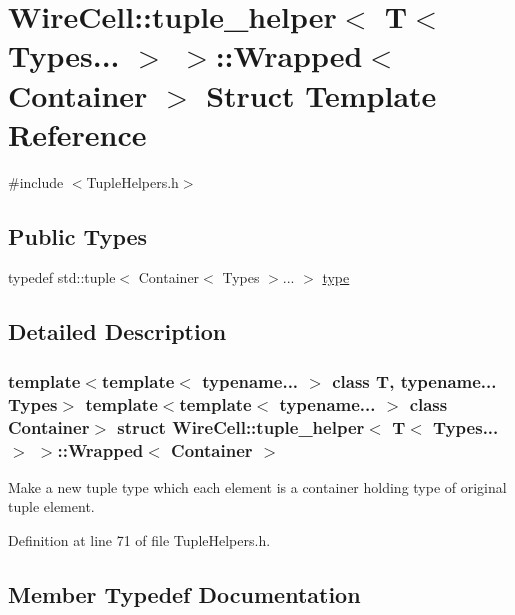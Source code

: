 \hypertarget{struct_wire_cell_1_1tuple__helper_3_01_t_3_01_types_8_8_8_01_4_01_4_1_1_wrapped}{}\section{Wire\+Cell\+:\+:tuple\+\_\+helper$<$ T$<$ Types... $>$ $>$\+:\+:Wrapped$<$ Container $>$ Struct Template Reference}
\label{struct_wire_cell_1_1tuple__helper_3_01_t_3_01_types_8_8_8_01_4_01_4_1_1_wrapped}


{\ttfamily \#include $<$Tuple\+Helpers.\+h$>$}

\subsection*{Public Types}
\begin{DoxyCompactItemize}
\item 
typedef std\+::tuple$<$ Container$<$ Types $>$... $>$ \hyperlink{struct_wire_cell_1_1tuple__helper_3_01_t_3_01_types_8_8_8_01_4_01_4_1_1_wrapped_a7683cd8d0bef605ad870bea2f1ccd41d}{type}
\end{DoxyCompactItemize}


\subsection{Detailed Description}
\subsubsection*{template$<$template$<$ typename... $>$ class T, typename... Types$>$\newline
template$<$template$<$ typename... $>$ class Container$>$\newline
struct Wire\+Cell\+::tuple\+\_\+helper$<$ T$<$ Types... $>$ $>$\+::\+Wrapped$<$ Container $>$}

Make a new tuple type which each element is a container holding type of original tuple element. 

Definition at line 71 of file Tuple\+Helpers.\+h.



\subsection{Member Typedef Documentation}
\mbox{\label{struct_wire_cell_1_1tuple__helper_3_01_t_3_01_types_8_8_8_01_4_01_4_1_1_wrapped_a7683cd8d0bef605ad870bea2f1ccd41d}} 
